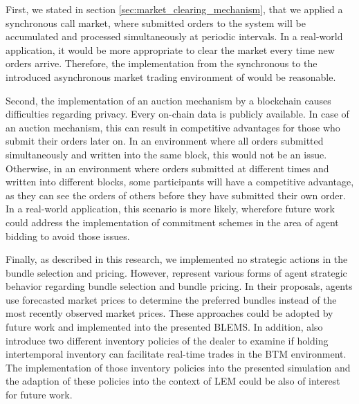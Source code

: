 First, we stated in section \ref{sec:market_clearing_mechanism}, that we
applied a synchronous call market, where submitted orders to the system
will be accumulated and processed simultaneously at periodic intervals.
In a real-world application, it would be more appropriate to clear the market every time new orders arrive. Therefore,
the implementation from the synchronous to the introduced asynchronous market trading environment of  would be reasonable. 

Second, the implementation of an auction mechanism by a blockchain causes 
difficulties regarding privacy. Every on-chain data is publicly available. 
In case of an auction mechanism, this can result in competitive advantages
for those who submit their orders later on. 
In an environment where all orders submitted simultaneously and written into the same block, this would not be an issue. 
Otherwise, in an environment where orders submitted at different times and written into different blocks,
some participants will have a competitive advantage, as they can see the orders 
of others before they have submitted their own order.
In a real-world application, this scenario is more likely, wherefore
future work could address the implementation of commitment schemes
in the area of agent bidding to avoid those issues.

Finally, as described in this research, we implemented no strategic
actions in the bundle selection and pricing. 
However,  represent various 
forms of agent strategic behavior regarding bundle selection 
and bundle pricing.
In their proposals, agents use forecasted market prices to determine the preferred bundles
instead of the most recently observed market prices. 
These approaches could be adopted by future work and implemented
into the presented BLEMS.
In addition,  also introduce two
different inventory policies of the dealer to examine if holding intertemporal inventory can 
facilitate real-time trades in the BTM environment. The implementation of those inventory policies
into the presented simulation and the adaption of these policies
into the context of LEM could be also of interest for future work. 








\begin{comment}

\end{comment}